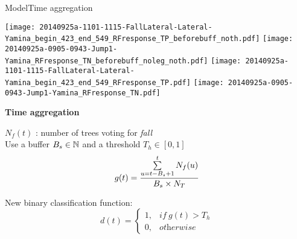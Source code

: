 \begin{frame}{Model}{Time aggregation}

\centering
\begin{minipage}[t]{0.7\linewidth}
    \centering
    \vspace{0pt}
    \renewcommand{\ratio}{0.5}
    \begin{overprint}
        
        \centering\texttt{[image: 20140925a-1101-1115-FallLateral-Lateral-Yamina\_begin\_423\_end\_549\_RFresponse\_TP\_beforebuff\_noth.pdf]}
        \texttt{[image: 20140925a-0905-0943-Jump1-Yamina\_RFresponse\_TN\_beforebuff\_noleg\_noth.pdf]}
        \centering\texttt{[image: 20140925a-1101-1115-FallLateral-Lateral-Yamina\_begin\_423\_end\_549\_RFresponse\_TP.pdf]}
        \texttt{[image: 20140925a-0905-0943-Jump1-Yamina\_RFresponse\_TN.pdf]}
    \end{overprint}

\end{minipage}

    \pause
    \medskip
    \centering\textbf{Time aggregation}
    
    \raggedright
    
    \centering
    \begin{minipage}[t]{0.42\linewidth}
        \vspace{0pt}
        $N_f(t)$ : number of trees voting for \emph{fall}\\
        Use a buffer $B_s \in \mathbb{N}$ and a threshold $T_h \in [0, 1]$
        \begin{equation*}
        g(t) = \frac{\sum\limits_{u=t-B_{s}+1}^{t}N_{f}(u)}{B_{s}\times N_{T}}\\
        \end{equation*}
    \end{minipage}\hspace{0.2cm}
    \begin{minipage}[t]{0.42\linewidth}
        \vspace{0pt}
        New binary classification function:
        \begin{equation*}
        d(t) = 
        \begin{cases}
        1, & \textit{if}\ g(t) > T_{h} \\
        0, & \textit{otherwise}
        \end{cases}
        \end{equation*}
    \end{minipage}

\end{frame}

